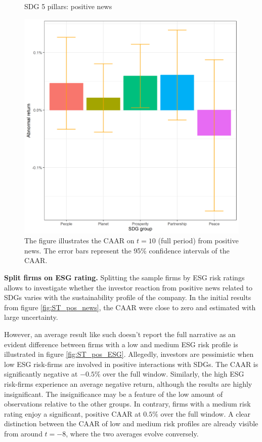 \begin{figure} [H]
    \centering
    \caption{SDG 5 pillars: positive news}
    \includegraphics[scale=0.6]{Projekt/1.Figures analysis/ST_positive_sdg_bar_groups_0.png}
    \caption*{\footnotesize The figure illustrates the CAAR on $t = 10$ (full period) from positive news. The error bars represent the 95\% confidence intervals of the CAAR.}
    \label{fig:ST_pos_bar}
\end{figure}


\noindent \textbf{Split firms on ESG rating.}
Splitting the sample firms by ESG risk ratings allows to investigate whether the investor reaction from positive news related to SDGs varies with the sustainability profile of the company. In the initial results from figure \ref{fig:ST_pos_news}, the CAAR were close to zero and estimated with large uncertainty. 

However, an average result like such doesn't report the full narrative as an evident difference between firms with a low and medium ESG risk profile is illustrated in figure  \ref{fig:ST_pos_ESG}. Allegedly, investors are pessimistic when low ESG risk-firms are involved in positive interactions with SDGs. The CAAR is significantly negative at $-0.5\%$ over the full window. Similarly, the high ESG risk-firms experience an average negative return, although the results are highly insignificant. The insignificance may be a feature of the low amount of observations relative to the other groups. In contrary, firms with a medium risk rating enjoy a significant, positive CAAR at $0.5\%$ over the full window. A clear distinction between the CAAR of low and medium risk profiles are already visible from around $t = -8$, where the two averages evolve conversely. 



